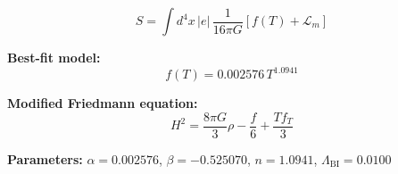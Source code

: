 
\begin{equation}
  S = \int d^4x \, |e| \, \frac{1}{16\pi G} \left[ f(T) + \mathcal{L}_m \right]
\end{equation}

\textbf{Best-fit model:}
\begin{equation}
  f(T) = 0.002576 \, T^{1.0941}
\end{equation}

\textbf{Modified Friedmann equation:}
\begin{equation}
  H^2 = \frac{8\pi G}{3} \rho - \frac{f}{6} + \frac{T f_T}{3}
\end{equation}

\textbf{Parameters:}
$\alpha = 0.002576$, \quad
$\beta = -0.525070$, \quad
$n = 1.0941$, \quad
$\Lambda_{\text{BI}} = 0.0100$